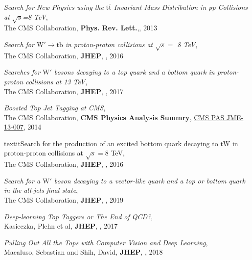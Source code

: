 \documentclass[12pt]{article}
\begin{document}
\begin{flushleft}
\begin{thebibliography}{1}


  \textit{Search for New Physics using the $\mathrm{t\bar{t}}$ Invariant Mass Distribution in pp Collisions at $\sqrt{s}$=8  TeV},\\
 The CMS Collaboration, \textbf{Phys. Rev. Lett.},{}, 2013

  \textit{Search for $\mathrm{W' \to tb}$ in proton-proton collisions at $\sqrt{s} = $ 8 TeV},\\
 The CMS Collaboration, \textbf{JHEP}, , 2016

  \textit{Searches for $\mathrm{W'}$ bosons decaying to a top quark and a bottom quark in proton-proton collisions at 13 TeV}, \\
  The CMS Collaboration, \textbf{JHEP}, , 2017



 \textit{Boosted Top Jet Tagging at CMS},\\
 The CMS Collaboration, \textbf{CMS Physics Analysis Summry}, \href{http://cms-physics.web.cern.ch/cms-physics/public/JME-13-007-pas.pdf}{{\color{blue}\underline{CMS PAS JME-13-007}}}, 2014


  textit{Search for the production of an excited bottom quark decaying to $\mathrm{tW}$ in proton-proton collisions at $ \sqrt{s}=8 $ TeV},\\
The CMS Collaboration, \textbf{JHEP}, , 2016



  \textit{Search for a $\mathrm{W'}$ boson decaying to a vector-like quark and a top or bottom quark in the all-jets final state},\\
The CMS Collaboration, \textbf{JHEP}, , 2019

  \textit{Deep-learning Top Taggers or The End of QCD?},\\
 Kasieczka, Plehn et al, \textbf{JHEP}, , 2017

  \textit{Pulling Out All the Tops with Computer Vision and Deep Learning},\\
 Macaluso, Sebastian and Shih, David, \textbf{JHEP}, , 2018



\end{thebibliography}
\end{flushleft}
\end{document}
